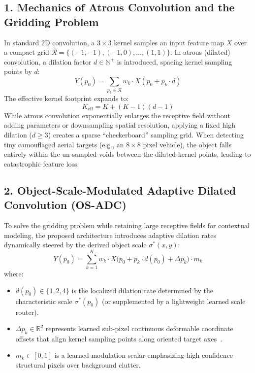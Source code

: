 \documentclass[12pt,a4paper]{report}
\begin{document}
\subsection{1. Mechanics of Atrous Convolution and the Gridding Problem}
In standard 2D convolution, a $3 \times 3$ kernel samples an input feature map $X$ over a compact grid $\mathcal{R} = \{(-1, -1), (-1, 0), \dots, (1, 1)\}$. In atrous (dilated) convolution, a dilation factor $d \in \mathbb{N}^+$ is introduced, spacing kernel sampling points by $d$:
\begin{equation}
    Y(p_0) = \sum_{p_k \in \mathcal{R}} w_k \cdot X(p_0 + p_k \cdot d)
\end{equation}
The effective kernel footprint expands to:
\begin{equation}
    K_{\text{eff}} = K + (K - 1)(d - 1)
\end{equation}
While atrous convolution exponentially enlarges the receptive field without adding parameters or downsampling spatial resolution, applying a fixed high dilation ($d \ge 3$) creates a sparse ``checkerboard'' sampling grid. When detecting tiny camouflaged aerial targets (e.g., an $8 \times 8$ pixel vehicle), the object falls entirely within the un-sampled voids between the dilated kernel points, leading to catastrophic feature loss.

\subsection{2. Object-Scale-Modulated Adaptive Dilated Convolution (OS-ADC)}
To solve the gridding problem while retaining large receptive fields for contextual modeling, the proposed architecture introduces adaptive dilation rates dynamically steered by the derived object scale $\sigma^*(x, y)$:
\begin{equation}
    Y(p_0) = \sum_{k=1}^{K} w_k \cdot X\big(p_0 + p_k \cdot d(p_0) + \Delta p_k\big) \cdot m_k
\end{equation}
where:
\begin{itemize}
    \item $d(p_0) \in \{1, 2, 4\}$ is the localized dilation rate determined by the characteristic scale $\sigma^*(p_0)$ (or supplemented by a lightweight learned scale router).
    \item $\Delta p_k \in \mathbb{R}^2$ represents learned sub-pixel continuous deformable coordinate offsets that align kernel sampling points along oriented target axes~\cite{wang2023internimage}.
    \item $m_k \in [0, 1]$ is a learned modulation scalar emphasizing high-confidence structural pixels over background clutter.
\end{itemize}
\end{document}
